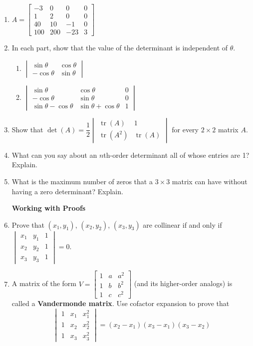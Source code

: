 \documentclass{article}
\theoremstyle{mystyle}
\begin{document}
\begin{enumerate}
\item[32.] $A=\begin{bmatrix}-3&0&0&0\\1&2&0&0\\40&10&-1&0\\100&200&-23&3\end{bmatrix}$

\item[33.] In each part, show that the value of the determinant is independent of $\theta$.
\begin{enumerate}
  \item[(a)] $\begin{vmatrix}\sin\theta&\cos\theta\\-\cos\theta&\sin\theta\end{vmatrix}$
  \item[(b)] $\begin{vmatrix}\sin\theta&\cos\theta&0\\-\cos\theta&\sin\theta&0\\\sin\theta-\cos\theta&\sin\theta+\cos\theta&1\end{vmatrix}$
\end{enumerate}

\item[36.] Show that $\det(A)=\dfrac{1}{2}\begin{vmatrix}\operatorname{tr}(A)&1\\\operatorname{tr}(A^2)&\operatorname{tr}(A)\end{vmatrix}$ for every $2\times2$ matrix $A$.

\item[37.] What can you say about an $n$th-order determinant all of whose entries are 1? Explain.

\item[38.] What is the maximum number of zeros that a $3\times3$ matrix can have without having a zero determinant? Explain.

\noindent\textbf{Working with Proofs}

\item[40.] Prove that $(x_1,y_1)$, $(x_2,y_2)$, $(x_3,y_3)$ are collinear if and only if
$\begin{vmatrix}x_1&y_1&1\\x_2&y_2&1\\x_3&y_3&1\end{vmatrix}=0$.

\item[43.] A matrix of the form $V=\begin{bmatrix}1&a&a^2\\1&b&b^2\\1&c&c^2\end{bmatrix}$ (and its higher-order analogs) is called a \textbf{Vandermonde matrix}. Use cofactor expansion to prove that
\[
\begin{vmatrix}1&x_1&x_1^2\\1&x_2&x_2^2\\1&x_3&x_3^2\end{vmatrix}=(x_2-x_1)(x_3-x_1)(x_3-x_2)
\]

\end{enumerate}
\end{document}
